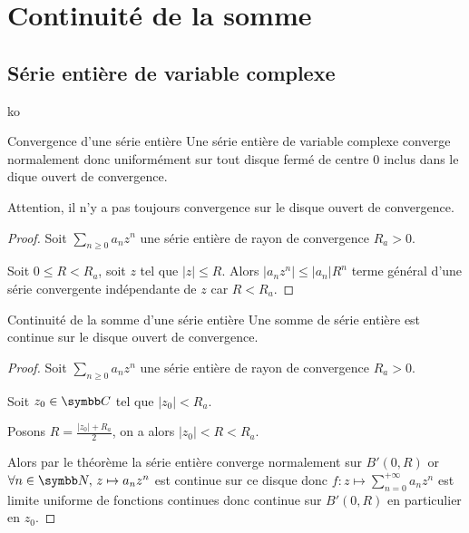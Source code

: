 \section{Continuité de la somme }
\subsection{Série entière de variable complexe }

ko

\lvspace 
\lvspace 
\begin{theoreme}{Convergence d'une série entière}{}
    Une série entière de variable complexe converge normalement donc uniformément sur tout disque 
    fermé de centre $0$ inclus dans le dique ouvert de convergence. 
\end{theoreme}

\begin{remarque}
    Attention, il n'y a pas toujours convergence sur le disque ouvert de convergence. 
\end{remarque}

\begin{proof}
    Soit $\sum_{n \geqslant 0} a_n z^n$ une série entière de rayon de convergence $R_a > 0$.

    Soit $0 \leqslant R < R_a$, soit $z$ tel que $|z| \leqslant R$. Alors 
    $|a_n z^n| \leqslant |a_n| R^n$ terme général d'une série convergente indépendante de $z$ 
    car $R < R_a$.
\end{proof}

\begin{corollaire}{Continuité de la somme d'une série entière}{}
    Une somme de série entière est continue sur le disque ouvert de convergence.
\end{corollaire}


\begin{proof}
    Soit $\sum_{n \geqslant 0} a_n z^n$ une série entière de rayon de convergence $R_a > 0$.

    Soit $z_0 \in \C$ tel que $|z_0| < R_a$.

    Posons $\displaystyle R = \frac{|z_0| + R_a }{2 }$, on a alors $|z_0| < R < R_a$.

    Alors par le théorème la série entière converge normalement sur $B'(0, R)$ 
    or $\forall n \in \N, \, z \mapsto a_n z^n$ est continue sur ce disque donc 
    $\displaystyle f : z \mapsto \sum_{n = 0}^{+\infty} a_n z^n$ est limite uniforme de fonctions continues 
    donc continue sur $B'(0, R)$ en particulier en $z_0$.


\end{proof}



